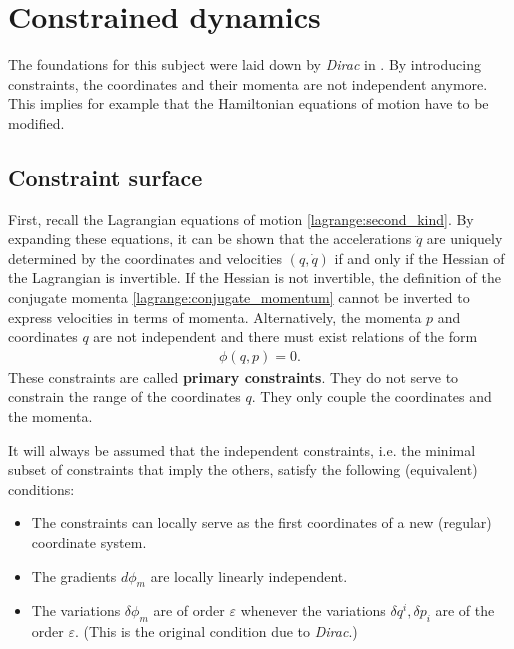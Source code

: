 \chapter{Constrained dynamics}\label{chapter:constrained_dynamics}

    The foundations for this subject were laid down by \textit{Dirac} in \cite{constrained}. By introducing constraints, the coordinates and their momenta are not independent anymore. This implies for example that the Hamiltonian equations of motion have to be modified.

\section{Constraint surface}

    First, recall the Lagrangian equations of motion \ref{lagrange:second_kind}. By expanding these equations, it can be shown that the accelerations $\ddot{q}$ are uniquely determined by the coordinates and velocities $(q,\dot{q})$ if and only if the Hessian of the Lagrangian is invertible. If the Hessian is not invertible, the definition of the conjugate momenta \ref{lagrange:conjugate_momentum} cannot be inverted to express velocities in terms of momenta. Alternatively, the momenta $p$ and coordinates $q$ are not independent and there must exist relations of the form
    \begin{gather}
        \phi(q,p) = 0.
    \end{gather}
    These constraints are called \textbf{primary constraints}. They do not serve to constrain the range of the coordinates $q$. They only couple the coordinates and the momenta.

    \begin{axiom}
        It will always be assumed that the independent constraints, i.e. the minimal subset of constraints that imply the others, satisfy the following (equivalent) conditions:
        \begin{itemize}
            \item The constraints can locally serve as the first coordinates of a new (regular) coordinate system.
            \item The gradients $d\phi_m$ are locally linearly independent.
            \item The variations $\delta\phi_m$ are of order $\varepsilon$ whenever the variations $\delta q^i,\delta p_i$ are of the order $\varepsilon$. (This is the original condition due to \textit{Dirac}.)
        \end{itemize}
    \end{axiom}

